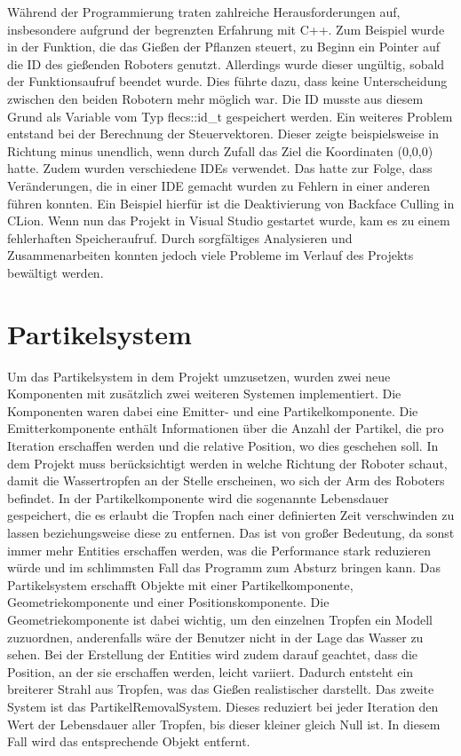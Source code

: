 Während der Programmierung traten zahlreiche Herausforderungen auf, insbesondere aufgrund der begrenzten Erfahrung mit C++. Zum Beispiel wurde in der Funktion, die das Gießen der Pflanzen steuert, zu Beginn ein Pointer auf die ID des gießenden Roboters genutzt. Allerdings wurde dieser ungültig, sobald der Funktionsaufruf beendet wurde. Dies führte dazu, dass keine Unterscheidung zwischen den beiden Robotern mehr möglich war. Die ID musste aus diesem Grund als Variable vom Typ flecs::id\_t gespeichert werden. Ein weiteres Problem entstand bei der Berechnung der Steuervektoren. Dieser zeigte beispielsweise in Richtung minus unendlich, wenn durch Zufall das Ziel die Koordinaten (0,0,0) hatte. 
Zudem wurden verschiedene IDEs verwendet. Das hatte zur Folge, dass Veränderungen, die in einer IDE gemacht wurden zu Fehlern in einer anderen führen konnten. Ein Beispiel hierfür ist die Deaktivierung von Backface Culling in CLion. Wenn nun das Projekt in Visual Studio gestartet wurde, kam es zu einem fehlerhaften Speicheraufruf. Durch sorgfältiges Analysieren und Zusammenarbeiten konnten jedoch viele Probleme im Verlauf des Projekts bewältigt werden. 

\section{Partikelsystem}
Um das Partikelsystem in dem Projekt umzusetzen, wurden zwei neue Komponenten mit zusätzlich zwei weiteren Systemen implementiert. Die Komponenten waren dabei eine Emitter- und eine Partikelkomponente. Die Emitterkomponente enthält Informationen über die Anzahl der Partikel, die pro Iteration erschaffen werden und die relative Position, wo dies geschehen soll. In dem Projekt muss berücksichtigt werden in welche Richtung der Roboter schaut, damit die Wassertropfen an der Stelle erscheinen, wo sich der Arm des Roboters befindet. In der Partikelkomponente wird die sogenannte Lebensdauer gespeichert, die es erlaubt die Tropfen nach einer definierten Zeit verschwinden zu lassen beziehungsweise diese zu entfernen. Das ist von großer Bedeutung, da sonst immer mehr Entities erschaffen werden, was die Performance stark reduzieren würde und im schlimmsten Fall das Programm zum Absturz bringen kann. Das Partikelsystem erschafft Objekte mit einer Partikelkomponente, Geometriekomponente und einer Positionskomponente. Die Geometriekomponente ist dabei wichtig, um den einzelnen Tropfen ein Modell zuzuordnen, anderenfalls wäre der Benutzer nicht in der Lage das Wasser zu sehen. Bei der Erstellung der Entities wird zudem darauf geachtet, dass die Position, an der sie erschaffen werden, leicht variiert. Dadurch entsteht ein breiterer Strahl aus Tropfen, was das Gießen realistischer darstellt. Das zweite System ist das PartikelRemovalSystem. Dieses reduziert bei jeder Iteration den Wert der Lebensdauer aller Tropfen, bis dieser kleiner gleich Null ist. In diesem Fall wird das entsprechende Objekt entfernt.
